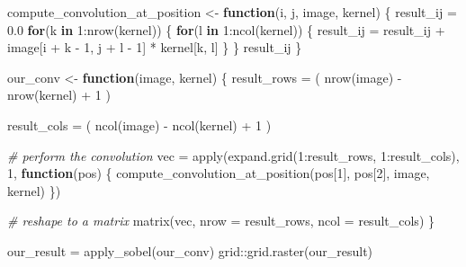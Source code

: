 \documentclass[
  a4paper,
]{article}
\newenvironment{Shaded}{\begin{snugshade}}{\end{snugshade}}
\newcommand{\AttributeTok}[1]{\textcolor[rgb]{0.77,0.63,0.00}{#1}}
\newcommand{\CommentTok}[1]{\textcolor[rgb]{0.56,0.35,0.01}{\textit{#1}}}
\newcommand{\ControlFlowTok}[1]{\textcolor[rgb]{0.13,0.29,0.53}{\textbf{#1}}}
\newcommand{\DecValTok}[1]{\textcolor[rgb]{0.00,0.00,0.81}{#1}}
\newcommand{\FloatTok}[1]{\textcolor[rgb]{0.00,0.00,0.81}{#1}}
\newcommand{\FunctionTok}[1]{\textcolor[rgb]{0.00,0.00,0.00}{#1}}
\newcommand{\NormalTok}[1]{#1}
\newcommand{\OtherTok}[1]{\textcolor[rgb]{0.56,0.35,0.01}{#1}}
\newcommand{\SpecialCharTok}[1]{\textcolor[rgb]{0.00,0.00,0.00}{#1}}
\begin{document}
\begin{Shaded}
\begin{Highlighting}[]
\NormalTok{compute\_convolution\_at\_position }\OtherTok{\textless{}{-}} \ControlFlowTok{function}\NormalTok{(i, j, image, kernel) \{}
\NormalTok{  result\_ij }\OtherTok{=} \FloatTok{0.0}
  \ControlFlowTok{for}\NormalTok{(k }\ControlFlowTok{in} \DecValTok{1}\SpecialCharTok{:}\FunctionTok{nrow}\NormalTok{(kernel)) \{}
    \ControlFlowTok{for}\NormalTok{(l }\ControlFlowTok{in} \DecValTok{1}\SpecialCharTok{:}\FunctionTok{ncol}\NormalTok{(kernel)) \{}
\NormalTok{      result\_ij }\OtherTok{=}\NormalTok{ result\_ij }\SpecialCharTok{+}\NormalTok{ image[i }\SpecialCharTok{+}\NormalTok{ k }\SpecialCharTok{{-}} \DecValTok{1}\NormalTok{, j }\SpecialCharTok{+}\NormalTok{ l }\SpecialCharTok{{-}} \DecValTok{1}\NormalTok{] }\SpecialCharTok{*}\NormalTok{ kernel[k, l]}
\NormalTok{    \}}
\NormalTok{  \}}
\NormalTok{  result\_ij}
\NormalTok{\}}


\NormalTok{our\_conv }\OtherTok{\textless{}{-}} \ControlFlowTok{function}\NormalTok{(image, kernel) \{}
\NormalTok{  result\_rows }\OtherTok{=}\NormalTok{ (}
    \FunctionTok{nrow}\NormalTok{(image) }\SpecialCharTok{{-}} \FunctionTok{nrow}\NormalTok{(kernel) }\SpecialCharTok{+} \DecValTok{1}
\NormalTok{  )}
  
\NormalTok{  result\_cols }\OtherTok{=}\NormalTok{ (}
    \FunctionTok{ncol}\NormalTok{(image) }\SpecialCharTok{{-}} \FunctionTok{ncol}\NormalTok{(kernel) }\SpecialCharTok{+} \DecValTok{1}
\NormalTok{  )}

  \CommentTok{\# perform the convolution}
\NormalTok{  vec }\OtherTok{=} \FunctionTok{apply}\NormalTok{(}\FunctionTok{expand.grid}\NormalTok{(}\DecValTok{1}\SpecialCharTok{:}\NormalTok{result\_rows, }\DecValTok{1}\SpecialCharTok{:}\NormalTok{result\_cols), }\DecValTok{1}\NormalTok{, }\ControlFlowTok{function}\NormalTok{(pos) \{}
    \FunctionTok{compute\_convolution\_at\_position}\NormalTok{(pos[}\DecValTok{1}\NormalTok{], pos[}\DecValTok{2}\NormalTok{], image, kernel)}
\NormalTok{  \})}
  
  \CommentTok{\# reshape to a matrix}
  \FunctionTok{matrix}\NormalTok{(vec, }\AttributeTok{nrow =}\NormalTok{ result\_rows, }\AttributeTok{ncol =}\NormalTok{ result\_cols)}
\NormalTok{\}}

\NormalTok{our\_result }\OtherTok{=} \FunctionTok{apply\_sobel}\NormalTok{(our\_conv)}
\NormalTok{grid}\SpecialCharTok{::}\FunctionTok{grid.raster}\NormalTok{(our\_result)}
\end{Highlighting}
\end{Shaded}
\end{document}
